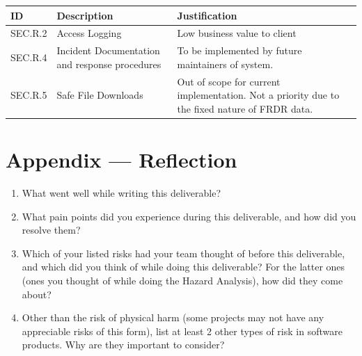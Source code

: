 \documentclass{article}
\begin{document}
\begin{table}[h!]
\begin{tabularx}{\textwidth}{ l X X } 
    \textbf{ID} & \textbf{Description} & \textbf{Justification} \\
    \hline
    SEC.R.2  & Access Logging & Low business value to client  \\
    \hline
    SEC.R.4 & Incident Documentation and response procedures & To be implemented by future maintainers of system.  \\
    \hline
        SEC.R.5 & Safe File Downloads & Out of scope for current implementation. Not a priority due to the fixed nature of FRDR data.   \\
    \hline
\end{tabularx}
\end{table}


\newpage{}

\section*{Appendix --- Reflection}



\begin{enumerate}
    \item What went well while writing this deliverable? 
    \item What pain points did you experience during this deliverable, and how
    did you resolve them?
    \item Which of your listed risks had your team thought of before this
    deliverable, and which did you think of while doing this deliverable? For
    the latter ones (ones you thought of while doing the Hazard Analysis), how
    did they come about?
    \item Other than the risk of physical harm (some projects may not have any
    appreciable risks of this form), list at least 2 other types of risk in
    software products. Why are they important to consider?
\end{enumerate}
\end{document}
